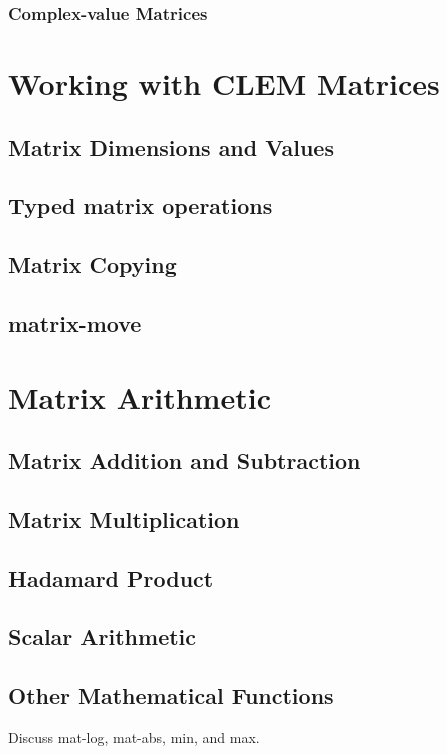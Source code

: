 \documentclass[10pt]{article}
\begin{document}
\subsubsection{Complex-value Matrices}
\baselineskip14pt
\clearpage
\section{Working with CLEM Matrices}
\baselineskip12pt
\subsection{Matrix Dimensions and Values}
\baselineskip14pt
\baselineskip12pt
\subsection{Typed matrix operations}
\baselineskip14pt
\baselineskip12pt
\subsection{Matrix Copying}
\baselineskip14pt
\baselineskip12pt
\subsection{matrix-move}
\baselineskip14pt
\clearpage
\section{Matrix Arithmetic}
\baselineskip12pt
\subsection{Matrix Addition and Subtraction}
\baselineskip14pt
\baselineskip12pt
\subsection{Matrix Multiplication}
\baselineskip14pt
\baselineskip12pt
\subsection{Hadamard Product}
\baselineskip14pt
\baselineskip12pt
\subsection{Scalar Arithmetic}
\baselineskip14pt
\baselineskip12pt
\subsection{Other Mathematical Functions}
\baselineskip14pt
Discuss mat-log, mat-abs, min, and max.
\end{document}
